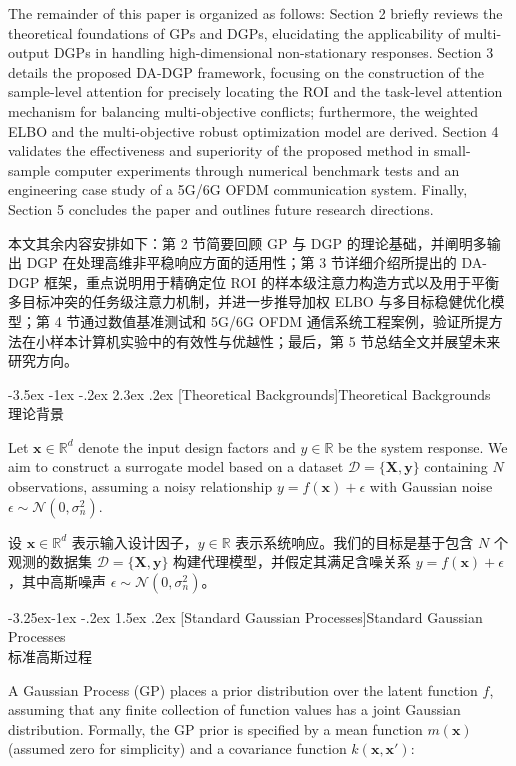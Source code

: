 \documentclass[11pt]{article}
\makeatletter
\renewcommand\section{\@startsection {section}{1}{\z@}%
                                       {-3.5ex \@plus -1ex \@minus -.2ex}%
                                       {2.3ex \@plus.2ex}%
                                       {\normalfont\fontfamily{phv}\fontsize{16}{19}\bfseries}}
\renewcommand\subsection{\@startsection{subsection}{2}{\z@}%
                                         {-3.25ex\@plus -1ex \@minus -.2ex}%
                                         {1.5ex \@plus .2ex}%
                                         {\normalfont\fontfamily{phv}\fontsize{14}{17}\bfseries}}
\newcommand{\bisection}[2]{\section[#1]{#1\protect\\#2}}
\newcommand{\bisubsection}[2]{\subsection[#1]{#1\protect\\#2}}
\makeatother
\begin{document}
The remainder of this paper is organized as follows: Section 2 briefly reviews the theoretical foundations of GPs and DGPs, elucidating the applicability of multi-output DGPs in handling high-dimensional non-stationary responses. Section 3 details the proposed DA-DGP framework, focusing on the construction of the sample-level attention for precisely locating the ROI and the task-level attention mechanism for balancing multi-objective conflicts; furthermore, the weighted ELBO and the multi-objective robust optimization model are derived. Section 4 validates the effectiveness and superiority of the proposed method in small-sample computer experiments through numerical benchmark tests and an engineering case study of a 5G/6G OFDM communication system. Finally, Section 5 concludes the paper and outlines future research directions.

本文其余内容安排如下：第 2 节简要回顾 GP 与 DGP 的理论基础，并阐明多输出 DGP 在处理高维非平稳响应方面的适用性；第 3 节详细介绍所提出的 DA-DGP 框架，重点说明用于精确定位 ROI 的样本级注意力构造方式以及用于平衡多目标冲突的任务级注意力机制，并进一步推导加权 ELBO 与多目标稳健优化模型；第 4 节通过数值基准测试和 5G/6G OFDM 通信系统工程案例，验证所提方法在小样本计算机实验中的有效性与优越性；最后，第 5 节总结全文并展望未来研究方向。

\bisection{Theoretical Backgrounds}{理论背景} \label{sec:background}

Let $\mathbf{x} \in \mathbb{R}^d$ denote the input design factors and $y \in \mathbb{R}$ be the system response. We aim to construct a surrogate model based on a dataset $\mathcal{D}=\{\mathbf{X}, \mathbf{y}\}$ containing $N$ observations, assuming a noisy relationship $y = f(\mathbf{x}) + \epsilon$ with Gaussian noise $\epsilon \sim \mathcal{N}(0, \sigma_n^2)$.

设 $\mathbf{x} \in \mathbb{R}^d$ 表示输入设计因子，$y \in \mathbb{R}$ 表示系统响应。我们的目标是基于包含 $N$ 个观测的数据集 $\mathcal{D}=\{\mathbf{X}, \mathbf{y}\}$ 构建代理模型，并假定其满足含噪关系 $y = f(\mathbf{x}) + \epsilon$，其中高斯噪声 $\epsilon \sim \mathcal{N}(0, \sigma_n^2)$。

\bisubsection{Standard Gaussian Processes}{标准高斯过程} \label{subsec:gp}

A Gaussian Process (GP) places a prior distribution over the latent function $f$, assuming that any finite collection of function values has a joint Gaussian distribution. Formally, the GP prior is specified by a mean function $m(\mathbf{x})$ (assumed zero for simplicity) and a covariance function $k(\mathbf{x}, \mathbf{x}')$:
\end{document}
